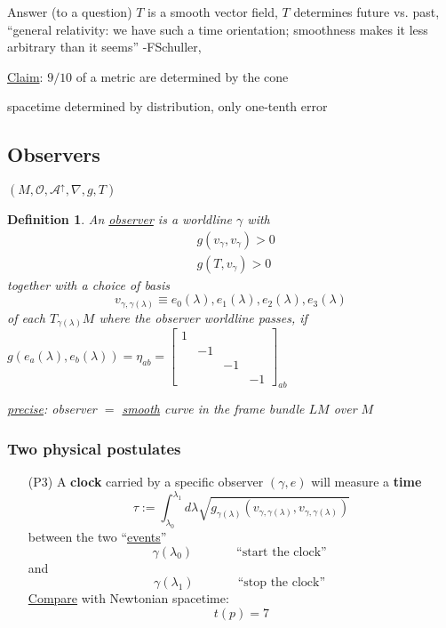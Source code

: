 \documentclass[10pt, twoside]{amsart}
\newtheorem{definition}{Definition}
\begin{document}
\begin{multicols*}{2}
Answer (to a question) $T$ is a smooth vector field, $T$ determines future vs. past, ``general relativity: we have such a time orientation; smoothness makes it less arbitrary than it seems'' -FSchuller,


\underline{Claim}: $9/10$ of a metric are determined by the cone

spacetime determined by distribution, only one-tenth error 

\subsection{Observers} $(M,\mathcal{O}, \mathcal{A}^{\uparrow},\nabla ,g, T)$
\begin{definition}
  An \underline{observer} is a worldline $\gamma$ with
\[
\begin{aligned}
  & g(v_{\gamma}, v_{\gamma}) >  0 \\ 
  & g(T,v_{\gamma}) > 0 
\end{aligned}
\]
together with a choice of basis
\[
v_{\gamma,\gamma(\lambda)} \equiv e_0(\lambda) , e_1(\lambda), e_2(\lambda), e_3(\lambda)
\]
of each $T_{\gamma(\lambda)}M$ where the observer worldline passes, if $g(e_a(\lambda), e_b(\lambda)) = \eta_{ab} = \left[ \begin{matrix} 1 & & & \\ & -1 & & \\ & & -1 & \\ & & & -1 \end{matrix} \right]_{ab}$

\underline{precise}: observer $=$ \underline{smooth} curve in the frame bundle $LM$ over $M$
\end{definition}

\subsubsection{Two physical postulates}

\begin{enumerate}
  \item[(P3)] A \textbf{clock} carried by a specific observer $(\gamma, e)$ will measure a \textbf{time}
\[
\tau := \int_{\lambda_0}^{\lambda_1} d\lambda \sqrt{ g_{\gamma(\lambda)}(v_{\gamma,\gamma(\lambda)}, v_{\gamma,\gamma(\lambda)}) }
\]
between the two ``\underline{events}''
\[
\gamma(\lambda_0) \quad \quad \quad \, \text{ ``start the clock'' }
\]
and 
\[
\gamma(\lambda_1) \quad \quad \quad \, \text{ ``stop the clock'' }
\]
\underline{Compare} with Newtonian spacetime:
\[
t(p)=7
\]


\end{enumerate}
\end{multicols*}
\end{document}
